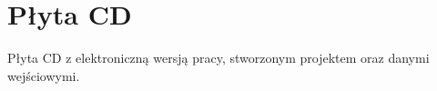 \chapter{Płyta CD}

Płyta CD z elektroniczną wersją pracy, stworzonym projektem oraz danymi wejściowymi.